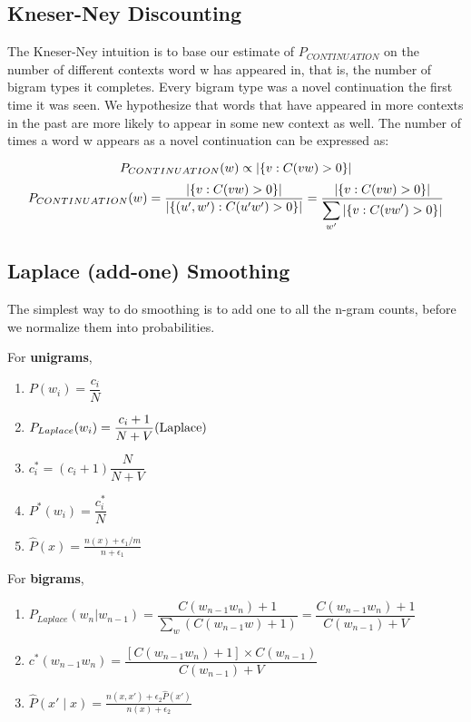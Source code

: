 \subsection{Kneser-Ney Discounting}\label{Kneser-Ney Discounting}
The Kneser-Ney intuition is to base our estimate of $P_{CONTINUATION}$ on the number of different contexts word w has appeared in, that is, the number of bigram types it completes. Every bigram type was a novel continuation the first time it was seen. We hypothesize that words that have appeared in more contexts in the
past are more likely to appear in some new context as well. The number of times a word w appears as a novel continuation can be expressed as:

\[
    P_{CONTINUATION}(w) \propto \left| \left\{v : C(vw) > 0\right\} \right|
\]
\[
    P_{CONTINUATION}(w) = \dfrac{\left| \left\{v : C(vw) > 0\right\} \right|}{\left| \left\{(u',w') : C(u'w') > 0\right\} \right| } = \dfrac{\left| \left\{v : C(vw) > 0\right\} \right|}{\displaystyle\sum_{w'} \left| \left\{v : C(vw') > 0\right\} \right|}
\]

\subsection{Laplace (add-one) Smoothing \cite{nlp-1,dnn-1}}
The simplest way to do smoothing is to add one to all the n-gram counts, before we normalize them into probabilities.





\noindent
For \textbf{unigrams},
\begin{enumerate}[itemsep=0.15cm]
    \item $P(w_i) = \dfrac{c_i}{N}$
    
    \item $P_{Laplace}(w_i) = \dfrac{c_i + 1}{N + V} \hfill \text{(Laplace)}$
    
    \item $c_i^* = (c_i +1)\dfrac{N}{N + V}$
        
    \item $P^*(w_i) = \dfrac{c_i^*}{N}$

    \item $\hat{P}(x) = \frac{n(x) + \epsilon_1/m}{n + \epsilon_1}$ \hfill \cite{dnn-1}
\end{enumerate}

\vspace{0.5cm}
\noindent
For \textbf{bigrams},

\begin{enumerate}[itemsep=0.15cm]
    \item $P_{Laplace}(w_n|w_{n-1}) = \dfrac{C(w_{n-1}w_n) + 1}{\sum_w (C(w_{n-1}w) + 1)} = \dfrac{C(w_{n-1}w_n) + 1}{C(w_{n-1}) + V} $

    \item $c^*(w_{n-1}w_n) = \dfrac{[C(w_{n-1}w_n)+1] \times C(w_{n-1})}{C(w_{n-1}) + V} $

    \item $\hat{P}(x' \mid x)  = \frac{n(x, x') + \epsilon_2 \hat{P}(x')}{n(x) + \epsilon_2}$ \hfill \cite{dnn-1}
\end{enumerate}

